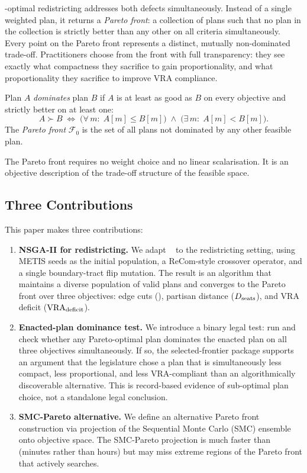 \pareto{}-optimal redistricting addresses both defects simultaneously.
Instead of a single weighted plan, it returns a \emph{Pareto front}: a
collection of plans such that no plan in the collection is strictly better
than any other on all criteria simultaneously.
Every point on the Pareto front represents a distinct, mutually non-dominated
trade-off.
Practitioners choose from the front with full transparency: they see exactly
what compactness they sacrifice to gain proportionality, and what proportionality
they sacrifice to improve VRA compliance.

\begin{definition}
\label{def:dominance}
Plan $A$ \emph{dominates} plan $B$ if $A$ is at least as good as $B$ on every
objective and strictly better on at least one:
\[
  A \succ B \;\iff\;
  \bigl(\forall\, m:\; A[m] \leq B[m]\bigr)
  \;\wedge\;
  \bigl(\exists\, m:\; A[m] < B[m]\bigr).
\]
The \emph{Pareto front} $\mathcal{F}_0$ is the set of all plans not dominated
by any other feasible plan.
\end{definition}

The Pareto front requires no weight choice and no linear scalarisation.
It is an objective description of the trade-off structure of the feasible space.

\subsection{Three Contributions}

This paper makes three contributions:

\begin{enumerate}
\item \textbf{NSGA-II for redistricting.}
  We adapt \nsga{}~\citep{deb2002} to the redistricting setting, using METIS
  seeds as the initial population, a ReCom-style crossover operator, and a
  single boundary-tract flip mutation.
  The result is an algorithm that maintains a diverse population of valid plans
  and converges to the Pareto front over three objectives: edge cuts (\EC),
  partisan distance ($D_{\mathrm{seats}}$), and VRA deficit ($\mathrm{VRA}_{\mathrm{deficit}}$).

\item \textbf{Enacted-plan dominance test.}
  We introduce a binary legal test: run \nsga{} and check whether any
  Pareto-optimal plan dominates the enacted plan on all three objectives
  simultaneously.
  If so, the selected-frontier package supports an argument that the legislature
  chose a plan that is simultaneously less compact, less proportional, and less
  VRA-compliant than an algorithmically discoverable alternative.
  This is record-based evidence of sub-optimal plan choice, not a standalone
  legal conclusion.

\item \textbf{SMC-Pareto alternative.}
  We define an alternative Pareto front construction via projection of the
  Sequential Monte Carlo (SMC) ensemble~\citep{dellaLibera2026smc} onto
  objective space.
  The SMC-Pareto projection is much faster than \nsga{} (minutes rather than
  hours) but may miss extreme regions of the Pareto front that \nsga{} actively
  searches.
\end{enumerate}

